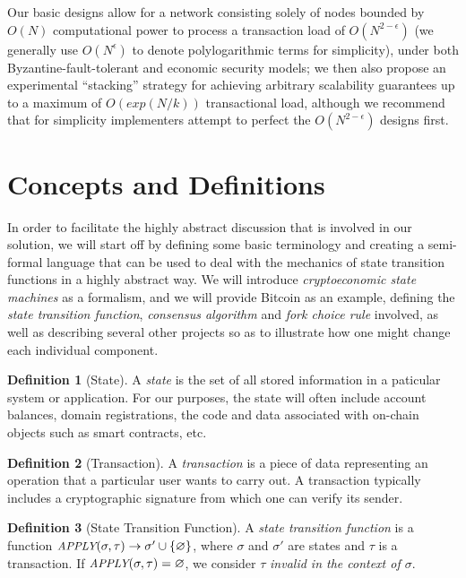 \documentclass[11pt,a4paper]{article}
\theoremstyle{plain}
\theoremstyle{definition}
\newtheorem{defn}{Definition}[section]
\theoremstyle{remark}
\newcommand{\makeintoafunction}[1]{\textit{\uppercase{\small #1}}}
\newcommand{\APPLY}{\makeintoafunction{apply}}
\begin{document}
Our basic designs allow for a network consisting solely of nodes bounded by $O(N)$ computational power to process a transaction load of $O(N^{2-\epsilon})$ (we generally use $O(N^\epsilon)$ to denote polylogarithmic terms for simplicity), under both Byzantine-fault-tolerant and economic security models; we then also propose an experimental ``stacking'' strategy for achieving arbitrary scalability guarantees up to a maximum of $O(exp(N/k))$ transactional load, although we recommend that for simplicity implementers attempt to perfect the $O(N^{2-\epsilon})$ designs first.

\section{Concepts and Definitions}

In order to facilitate the highly abstract discussion that is involved in our solution, we will start off by defining some basic terminology and creating a semi-formal language that can be used to deal with the mechanics of state transition functions in a highly abstract way. We will introduce \emph{cryptoeconomic state machines} as a formalism, and we will provide Bitcoin as an example, defining the \emph{state transition function}, \emph{consensus algorithm} and \emph{fork choice rule} involved, as well as describing several other projects so as to illustrate how one might change each individual component.

\begin{defn}[State]
A \emph{state} is the set of all stored information in a paticular system or application. For our purposes, the state will often include account balances, domain registrations, the code and data associated with on-chain objects such as smart contracts, etc.
\end{defn}

\begin{defn}[Transaction]
A \emph{transaction} is a piece of data representing an operation that a particular user wants to carry out. A transaction typically includes a cryptographic signature from which one can verify its sender.
\end{defn}

\begin{defn}[State Transition Function]
A \emph{state transition function} is a function $\APPLY(\sigma, \tau) \rightarrow \sigma' \cup \{\varnothing\}$, where $\sigma$ and $\sigma'$ are states and $\tau$ is a transaction. If $\APPLY(\sigma, \tau) = \varnothing$, we consider $\tau$ \emph{invalid in the context of $\sigma$}.
\end{defn}
\end{document}
